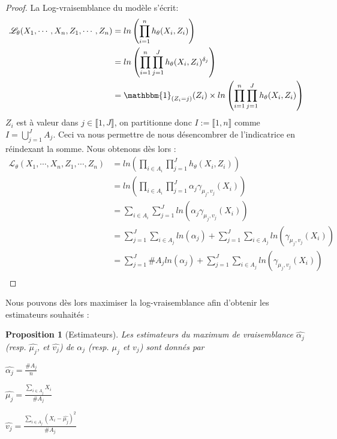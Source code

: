 \documentclass[frenchb]{report}
\newcommand{\1}{\mathbbm{1}}
\newtheorem{prop}{Proposition}
\theoremstyle{definition}\newtheorem{defn}{Définition}
\theoremstyle{definition}\newtheorem{exm}{Exemple}
\theoremstyle{definition}\newtheorem{nota}{Notation}
\theoremstyle{definition}\newtheorem{rem}{Remarque}
\begin{document}
\begin{proof}
La Log-vraisemblance du modèle s'écrit:
\begin{align*}
\mathcal{L}_\theta(X_1, \cdots, X_n, Z_1, \cdots, Z_n) 
&= ln\left(\displaystyle\prod_{i=1}^n h_\theta(X_i, Z_i) \right)\\
&= ln\left(\displaystyle\prod_{i=1}^n\prod_{j=1}^J h_\theta(X_i, Z_i)^{\delta_j} \right)\\
&= \1_{(Z_i = j)}(Z_i)\times ln\left(\displaystyle\prod_{i=1}^n\prod_{j=1}^J h_\theta(X_i, Z_i) \right)\\
\end{align*}
$Z_i$ est à valeur dans $j\in\llbracket 1, J \rrbracket$, on  partitionne donc $I := \llbracket1,n \rrbracket$ comme $I = \displaystyle\bigcup_{j=1}^J A_j$. \newline
Ceci va nous permettre de nous désencombrer de l'indicatrice en réindexant la somme. Nous obtenons dès lors : 
\begin{align*}
\mathcal{L}_\theta(X_1, \cdots, X_n, Z_1, \cdots, Z_n) &=  ln\left(\displaystyle\prod_{i\in A_i}\prod_{j=1}^J h_\theta(X_i, Z_i) \right)\\
&= ln\left(\displaystyle\prod_{i\in A_i}\prod_{j=1}^J  \alpha_j\gamma_{\mu_j, v_j}(X_i) \right)\\
&=\displaystyle\sum_{i\in A_i}\sum_{j=1}^J ln(\alpha_{j}\gamma_{\mu_j, v_j}(X_i))\\
&= \displaystyle\sum_{j=1}^J\sum_{i\in A_j} ln(\alpha_j)+ \sum_{j=1}^J\sum_{i\in A_j} ln(\gamma_{\mu_j, v_j}(X_i)) \\
&= \displaystyle\sum_{j=1}^J \#A_j ln(\alpha_j)+ \sum_{j=1}^J\sum_{i\in A_j} ln(\gamma_{\mu_j, v_j}(X_i)) \\
\end{align*}
\end{proof}
Nous pouvons dès lors maximiser la log-vraisemblance afin d'obtenir les estimateurs souhaités :
\begin{prop}[Estimateurs]
Les estimateurs du maximum de vraisemblance $\widehat{\alpha_j}$ (resp. $\widehat{\mu_j}$, et $\widehat{v_j}$) de $\alpha_j$ (resp. $\mu_j$ et $v_j$) sont donnés par
\begin{center}
$\widehat{\alpha_j} = \frac{\#A_j}{n}$
\end{center}
\begin{center}
$ \widehat{\mu_j} = \displaystyle\frac{\sum_{i\in A_j} X_i}{\#A_j} $
\end{center}
\begin{center}
$ \widehat{v_j} = \displaystyle \frac{\sum_{i\in A_j}(X_i - \widehat{\mu_j})^2}{\#A_j}$
\end{center}
\end{prop}
\end{document}
